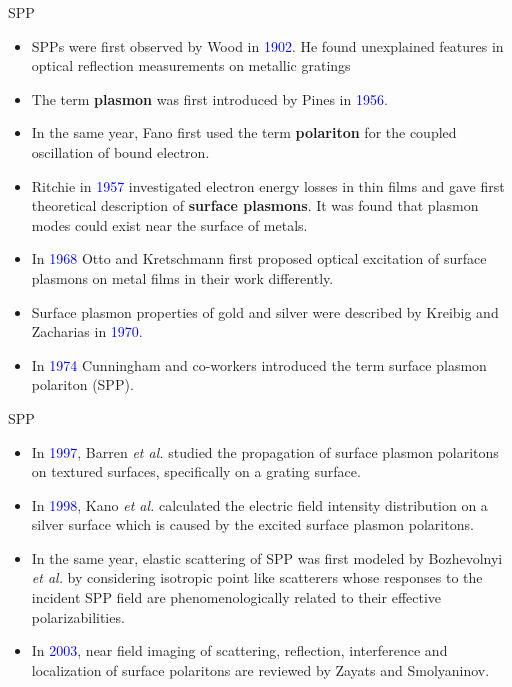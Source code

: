 \documentclass[9pt,aspectratio94]{beamer}
\begin{document}
   \begin{frame}{SPP}
   \begin{itemize}
      \item SPPs were first observed by Wood in \textcolor{blue}{1902}. He found
        unexplained features in optical reflection measurements on metallic gratings
      \item The term \textbf{plasmon} was first introduced by Pines in \textcolor{blue}{1956}.
      \item In the same year, Fano first used the term \textbf{polariton} for the coupled oscillation of bound electron.
      \item  Ritchie in \textcolor{blue}{1957} investigated electron energy losses in thin films and gave first theoretical description of\textbf{ surface plasmons}. It was found that plasmon modes could exist near the surface of metals. %
      \item In \textcolor{blue}{1968} Otto and Kretschmann  first proposed optical excitation of surface plasmons on metal films in their work differently.
      \item Surface plasmon properties
       of gold and silver were described by Kreibig
        and Zacharias in \textcolor{blue}{1970}.
        \item In \textcolor{blue}{1974} Cunningham and co-workers introduced the term surface plasmon polariton (SPP).
    \end{itemize} 
 \end{frame}
    
 \begin{frame}{SPP}
     \begin{itemize} 
    \item In \textcolor{blue}{1997}, Barren \textit{et al.} studied the propagation of surface plasmon polaritons on textured surfaces, specifically on a grating surface. 
\item In \textcolor{blue}{1998}, Kano \textit{et al.} calculated the electric field intensity distribution on a silver surface which is caused by the excited surface plasmon polaritons. 
\item In the same year, elastic scattering of SPP was first modeled by Bozhevolnyi \textit{et al.} by considering isotropic point like scatterers whose responses to the incident SPP field are phenomenologically related to their effective polarizabilities.

\item In \textcolor{blue}{2003}, near field imaging of scattering, reflection, interference and localization of surface polaritons are reviewed by  Zayats and Smolyaninov.
\end{itemize}
\end{frame}
\end{document}
